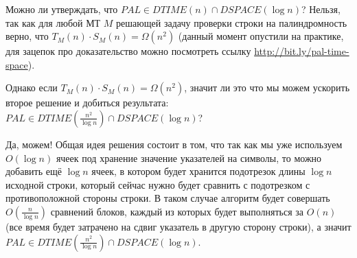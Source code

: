 \documentclass[
    11pt,
    a4paper
]{article}
\theoremstyle{definition}
\begin{document}
Можно ли утверждать, что $PAL \in DTIME(n) \cap DSPACE(\log n)$? Нельзя, так как для любой МТ $M$ решающей задачу проверки строки на палиндромность верно, что $T_M(n) \cdot S_M(n) = \Omega(n^2)$ (данный момент опустили на практике, для зацепок про доказательство можно посмотреть ссылку \url{http://bit.ly/pal-time-space}).

Однако если $T_M(n) \cdot S_M(n) = \Omega(n^2)$, значит ли это что мы можем ускорить второе решение и добиться результата: $PAL \in DTIME(\frac{n^2}{\log n}) \cap DSPACE(\log n)$?

Да, можем! Общая идея решения состоит в том, что так как мы уже используем $O(\log n)$ ячеек под хранение значение указателей на символы, то можно добавить ещё $\log n$ ячеек, в котором будет хранится подотрезок длины $\log n$ исходной строки, который сейчас нужно будет сравнить с подотрезком с противоположной стороны строки. В таком случае алгоритм будет совершать $O(\frac{n}{\log n})$ сравнений блоков, каждый из которых будет выполняться за $O(n)$ (все время будет затрачено на сдвиг указатель в другую сторону строки), а значит $PAL \in DTIME(\frac{n^2}{\log n}) \cap DSPACE(\log n)$.
\end{document}
